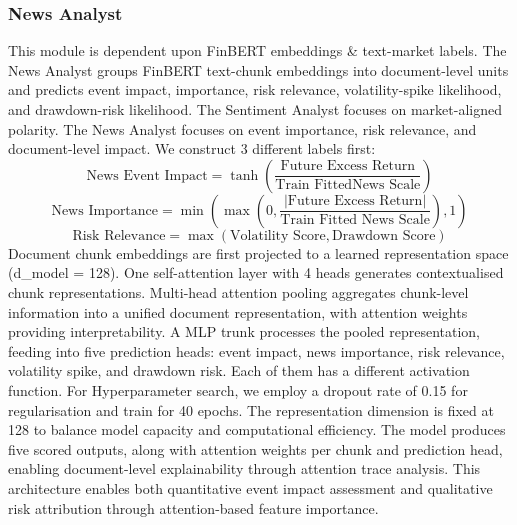 \documentclass[conference]{IEEEtran}
\begin{document}
\subsubsection{News Analyst}
This module is dependent upon FinBERT embeddings \& text-market labels. The News Analyst groups FinBERT text-chunk embeddings into document-level units and predicts event impact, importance, risk relevance, volatility-spike likelihood, and drawdown-risk likelihood. The Sentiment Analyst focuses on market-aligned polarity. The News Analyst focuses on event importance, risk relevance, and document-level impact. We construct 3 different labels first:
    \begin{equation}
        \text{News\ Event\ Impact} = \tanh( \frac{\text{Future\ Excess\ Return}}{\text{Train\ FittedNews\ Scale}} )\label{eq}
    \end{equation}
    \begin{equation}
        \text{News Importance}=\min\left(\max\left( 0,\frac{|\text{Future Excess Return}|}{\text{Train Fitted News Scale}} \right),1\right)
    \end{equation}
    \begin{equation}
        \text{Risk\ Relevance} = \max(\text{Volatility\ Score}, \text{Drawdown\ Score})\label{eq}
    \end{equation}
Document chunk embeddings are first projected to a learned representation space (d\_model = 128). One self-attention layer with 4 heads generates contextualised chunk representations. Multi-head attention pooling aggregates chunk-level information into a unified document representation, with attention weights providing interpretability. A MLP trunk processes the pooled representation, feeding into five prediction heads: event impact, news importance, risk relevance, volatility spike, and drawdown risk. Each of them has a different activation function.
For Hyperparameter search, we employ a dropout rate of 0.15 for regularisation and train for 40 epochs. The representation dimension is fixed at 128 to balance model capacity and computational efficiency. The model produces five scored outputs, along with attention weights per chunk and prediction head, enabling document-level explainability through attention trace analysis. This architecture enables both quantitative event impact assessment and qualitative risk attribution through attention-based feature importance.
\end{document}
